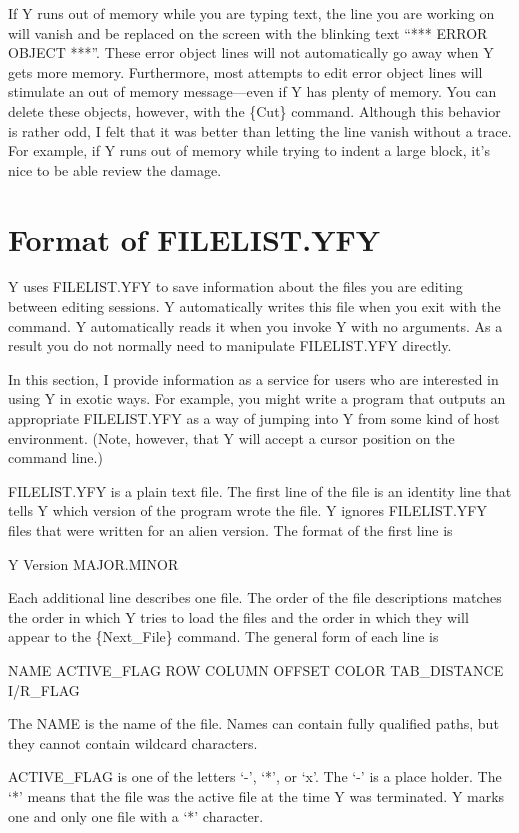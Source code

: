If Y runs out of memory while you are typing text, the line you are working on will vanish and
be replaced on the screen with the blinking text ``*** ERROR OBJECT ***''. These error object
lines will not automatically go away when Y gets more memory. Furthermore, most attempts to edit
error object lines will stimulate an out of memory message---even if Y has plenty of memory. You
can delete these objects, however, with the \{Cut\} command. Although this behavior is rather
odd, I felt that it was better than letting the line vanish without a trace. For example, if Y
runs out of memory while trying to indent a large block, it's nice to be able review the damage.

\section{Format of FILELIST.YFY}

Y uses FILELIST.YFY to save information about the files you are editing between editing
sessions. Y automatically writes this file when you exit with the  command. Y
automatically reads it when you invoke Y with no arguments. As a result you do not normally need
to manipulate FILELIST.YFY directly.

In this section, I provide information as a service for users who are interested in using Y in
exotic ways. For example, you might write a program that outputs an appropriate FILELIST.YFY as
a way of jumping into Y from some kind of host environment. (Note, however, that Y will accept a
cursor position on the command line.)

FILELIST.YFY is a plain text file. The first line of the file is an identity line that tells Y
which version of the program wrote the file. Y ignores FILELIST.YFY files that were written for
an alien version. The format of the first line is

Y Version MAJOR.MINOR

Each additional line describes one file. The order of the file descriptions matches the order in
which Y tries to load the files and the order in which they will appear to the \{Next\_File\}
command. The general form of each line is

NAME ACTIVE\_FLAG ROW COLUMN OFFSET COLOR TAB\_DISTANCE I/R\_FLAG

The NAME is the name of the file. Names can contain fully qualified paths, but they cannot
contain wildcard characters.

ACTIVE\_FLAG is one of the letters `-', `*', or `x'. The `-' is a place holder. The `*' means
that the file was the active file at the time Y was terminated. Y marks one and only one file
with a `*' character.

